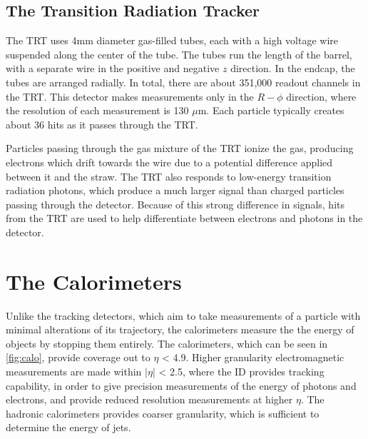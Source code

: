 \subsection{The Transition Radiation Tracker}

The \ac{TRT} uses 4mm diameter gas-filled tubes, each with a high voltage wire suspended along the center of the tube. The tubes run the length of the barrel, with a separate wire in the positive and negative $z$ direction. In the endcap, the tubes are arranged radially. In total, there are about 351,000 readout channels in the \ac{TRT}. This detector makes measurements only in the $R-\phi$ direction, where the resolution of each measurement is 130 $\mu$m. Each particle typically creates about 36 hits as it passes through the \ac{TRT}. 

Particles passing through the gas mixture of the \ac{TRT} ionize the gas, producing electrons which drift towards the wire due to a potential difference applied between it and the straw. The \ac{TRT} also responds to low-energy transition radiation photons, which produce a much larger signal than charged particles passing through the detector. Because of this strong difference in signals, hits from the \ac{TRT} are used to help differentiate between electrons and photons in the detector.

\section{The Calorimeters}
\label{sec:Calo}

Unlike the tracking detectors, which aim to take measurements of a particle with minimal alterations of its trajectory, the calorimeters measure the the energy of objects by stopping them entirely. The calorimeters, which can be seen in \autoref{fig:calo}, provide coverage out to $\eta$ < 4.9. Higher granularity electromagnetic measurements are made within $|\eta|$ < 2.5, where the \ac{ID} provides tracking capability, in order to give precision measurements of the energy of photons and electrons, and provide reduced resolution measurements at higher $\eta$. The hadronic calorimeters provides coarser granularity, which is sufficient to determine the energy of jets. 

